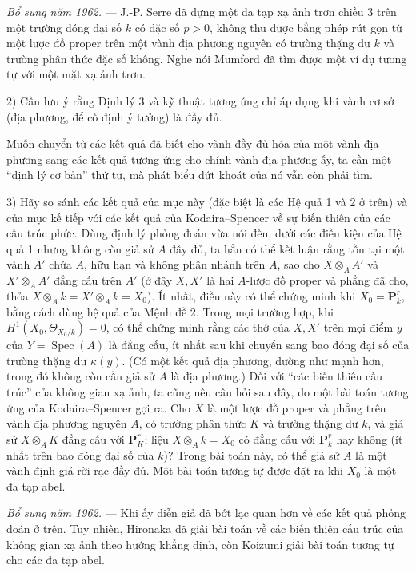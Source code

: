 \emph{Bổ sung năm 1962.} --- J.-P. Serre đã dựng một đa tạp xạ ảnh trơn chiều
3 trên một trường đóng đại số $k$ có đặc số $p>0$, không thu được bằng phép
rút gọn từ một lược đồ proper trên một vành địa phương nguyên có trường thặng
dư $k$ và trường phân thức đặc số không. Nghe nói Mumford đã tìm được một ví
dụ tương tự với một mặt xạ ảnh trơn.

2) Cần lưu ý rằng Định lý 3 và kỹ thuật tương ứng chỉ áp dụng khi vành cơ sở
(địa phương, để cố định ý tưởng) là đầy đủ.

Muốn chuyển từ các kết quả đã biết cho vành đầy đủ hóa của một vành địa phương
sang các kết quả tương ứng cho chính vành địa phương ấy, ta cần một “định lý
cơ bản” thứ tư, mà phát biểu dứt khoát của nó vẫn còn phải tìm.

3) Hãy so sánh các kết quả của mục này (đặc biệt là các Hệ quả 1 và 2 ở trên)
và của mục kế tiếp với các kết quả của Kodaira--Spencer về sự biến thiên của
các cấu trúc phức. Dùng định lý phỏng đoán vừa nói đến, dưới các điều kiện của
Hệ quả 1 nhưng không còn giả sử $A$ đầy đủ, ta hẳn có thể kết luận rằng tồn
tại một vành $A'$ chứa $A$, hữu hạn và không phân nhánh trên $A$, sao cho
$X\otimes_A A'$ và $X'\otimes_A A'$ đẳng cấu trên $A'$ (ở đây $X,X'$ là hai
$A$-lược đồ proper và phẳng đã cho, thỏa
$X\otimes_A k=X'\otimes_A k=X_0$). Ít nhất, điều này có thể chứng minh khi
$X_0=\mathbf P_k^r$, bằng cách dùng hệ quả của Mệnh đề 2. Trong mọi trường
hợp, khi $H^1(X_0,\Theta_{X_0/k})=0$, có thể chứng minh rằng các thớ của
$X,X'$ trên mọi điểm $y$ của $Y=\operatorname{Spec}(A)$ là đẳng cấu, ít nhất
sau khi chuyển sang bao đóng đại số của trường thặng dư $\kappa(y)$. (Có một
kết quả địa phương, dường như mạnh hơn, trong đó không còn cần giả sử $A$ là
địa phương.) Đối với “các biến thiên cấu trúc” của không gian xạ ảnh, ta cũng
nêu câu hỏi sau đây, do một bài toán tương ứng của Kodaira--Spencer gợi ra.
Cho $X$ là một lược đồ proper và phẳng trên vành địa phương nguyên $A$, có
trường phân thức $K$ và trường thặng dư $k$, và giả sử $X\otimes_A K$ đẳng
cấu với $\mathbf P_K^r$; liệu $X\otimes_A k=X_0$ có đẳng cấu với
$\mathbf P_k^r$ hay không (ít nhất trên bao đóng đại số của $k$)? Trong bài
toán này, có thể giả sử $A$ là một vành định giá rời rạc đầy đủ. Một bài toán
tương tự được đặt ra khi $X_0$ là một đa tạp abel.

\emph{Bổ sung năm 1962.} --- Khi ấy diễn giả đã bớt lạc quan hơn về các kết
quả phỏng đoán ở trên. Tuy nhiên, Hironaka đã giải bài toán về các biến thiên
cấu trúc của không gian xạ ảnh theo hướng khẳng định, còn Koizumi giải bài
toán tương tự cho các đa tạp abel.

